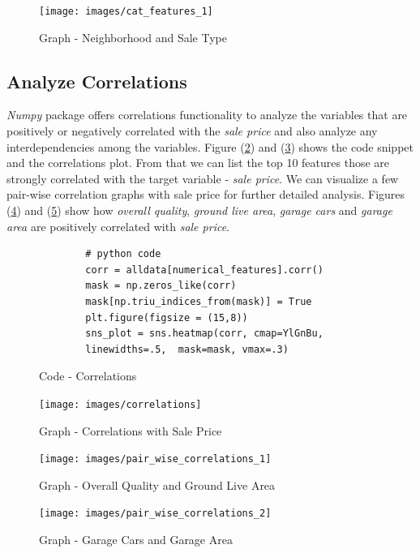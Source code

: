 \documentclass[sigconf]{acmart}
\begin{document}
	\begin{figure}[htb]
		\centering
		\texttt{[image: images/cat\_features\_1]}	
		\caption{Graph - Neighborhood and Sale Type} \label{fig:cat_features_1} 
	\end{figure}
	
	\subsection{Analyze Correlations}		
	{\em Numpy} package offers correlations functionality to analyze the variables that are positively or negatively correlated with the {\em sale price} and also analyze any interdependencies among the variables. Figure (\ref{c:cor}) and (\ref{fig:correlations}) shows the code snippet and the correlations plot. From that we can list the top 10 features those are strongly correlated with the target variable - {\em sale price}. We can visualize a few pair-wise correlation graphs with sale price for further detailed analysis. Figures (\ref{fig:pair-wise-correlations}) and (\ref{fig:pair-wise-correlations-2}) show how {\em overall quality}, {\em ground live area}, {\em garage cars} and {\em garage area} are positively correlated with {\em sale price}.
	
	\begin{figure}[htb]
		\begin{verbatim}	
		# python code 
		corr = alldata[numerical_features].corr()	
		mask = np.zeros_like(corr)
		mask[np.triu_indices_from(mask)] = True	
		plt.figure(figsize = (15,8))	
		sns_plot = sns.heatmap(corr, cmap=YlGnBu, 
		linewidths=.5,  mask=mask, vmax=.3)	
		\end{verbatim}
		\caption{Code - Correlations} \label{c:cor} 
	\end{figure}
	
	\begin{figure}[htb]
		\centering
		\texttt{[image: images/correlations]}	
		\caption{Graph - Correlations with Sale Price} \label{fig:correlations} 
	\end{figure}
	
	\begin{figure}[htb]
		\centering
		\texttt{[image: images/pair\_wise\_correlations\_1]}	
		\caption{Graph - Overall Quality and Ground Live Area} \label{fig:pair-wise-correlations} 
	\end{figure}
	
	\begin{figure}[htb]
		\centering
		\texttt{[image: images/pair\_wise\_correlations\_2]}	
		\caption{Graph - Garage Cars and Garage Area} \label{fig:pair-wise-correlations-2} 
	\end{figure}
	
\end{document}
